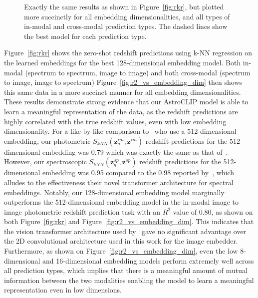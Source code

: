 \begin{figure}[t]
    \centering
    \caption{Exactly the same results as shown in Figure~\eqref{fig:rkr}, but plotted more succinctly for all embedding
    dimensionalities, and all types of in-modal and cross-modal prediction types.
    The dashed lines show the best model for each prediction type.}
    \label{fig:r2_vs_embedding_dim}
\end{figure}

Figure~\eqref{fig:rkr} shows the zero-shot redshift predictions using k-NN regression on the learned embeddings for
the best 128-dimensional embedding model.
Both in-modal (spectrum to spectrum, image to image) and both cross-modal (spectrum to image, image to spectrum)
Figure~\eqref{fig:r2_vs_embedding_dim} then shows this same data in a more succinct manner for all embedding dimensionalities.
These results demonstrate strong evidence that our AstroCLIP model is able to learn a meaningful representation of the
data, as the redshift predictions are highly correlated with the true redshift values, even with low embedding dimensionality.
For a like-by-like comparison to~\cite{astroclip} who use a 512-dimensional embedding, our photometric
$S_{kNN}(\mathbf{z}_{q}^{im}, \mathbf{z}^{im})$ redshift predictions for the 512-dimensional embedding was 0.79 which was
exactly the same as that of~\cite{astroclip}.
However, our spectroscopic $S_{kNN}(\mathbf{z}_{q}^{sp}, \mathbf{z}^{sp})$ redshift predictions for the 512-dimensional
embedding was 0.95 compared to the 0.98 reported by~\cite{astroclip}, which alludes to the effectiveness their novel
transformer architecture for spectral embeddings.
Notably, our 128-dimensional embedding model marginally outperforms the 512-dimensional embedding model in the in-modal
image to image photometric redshift prediction task with an $R^{2}$ value of 0.80, as shown on both Figure~\eqref{fig:rkr}
and Figure~\eqref{fig:r2_vs_embedding_dim}.
This indicates that the vision transformer architecture used by~\cite{astroclip} gave no significant advantage over the
2D convolutional architecture used in this work for the image embedder.
Furthermore, as shown on Figure~\eqref{fig:r2_vs_embedding_dim}, even the low 8-dimensional and 16-dimensional embedding
models perform extremely well across all prediction types, which implies that there is a meaningful amount of mutual
information between the two modalities enabling the model to learn a meaningful representation even in low dimensions.

